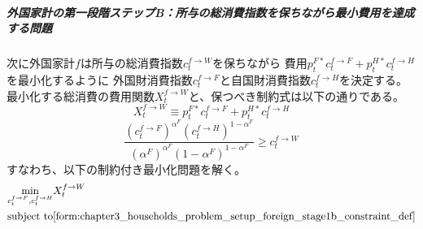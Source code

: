 \subparagraph{外国家計の第一段階ステップB：所与の総消費指数を保ちながら最小費用を達成する問題}
\label{sec:chapter3_households_problem_setup_foreign_stage1b}
次に外国家計\(f\)は所与の総消費指数\(c_t^{f\to W}\)を保ちながら
費用\(p_t^{F*}c_t^{f\to F}+p_t^{H*}c_t^{f\to H}\)を最小化するように
外国財消費指数\(c_t^{f\to F}\)と自国財消費指数\(c_t^{f\to H}\)を決定する。
最小化する総消費の費用関数\(X_t^{f\to W}\)と、保つべき制約式は以下の通りである。
\begin{equation}
\label{form:chapter3_households_problem_setup_foreign_stage1b_X_def}
    X_t^{f\to W}\equiv p_t^{F*}c_t^{f\to F}+p_t^{H*}c_t^{f\to H}
\end{equation}
\begin{equation}
\label{form:chapter3_households_problem_setup_foreign_stage1b_constraint_def}
    \frac{(c_t^{f\to F})^{\alpha^F}(c_t^{f\to H})^{1-\alpha^F}}{(\alpha^F)^{\alpha^F}(1-\alpha^F)^{1-\alpha^F}}\ge c_t^{f\to W}
\end{equation}
すなわち、以下の制約付き最小化問題を解く。
\begin{equation}
\label{form:chapter3_households_problem_setup_foreign_stage1b_min_def}
    \begin{aligned}
        \min_{c_t^{f\to F},c_t^{f\to H}}
        &X_t^{f\to W}\\
        \text{subject to}
        &\eqref{form:chapter3_households_problem_setup_foreign_stage1b_constraint_def}
    \end{aligned}
\end{equation}

